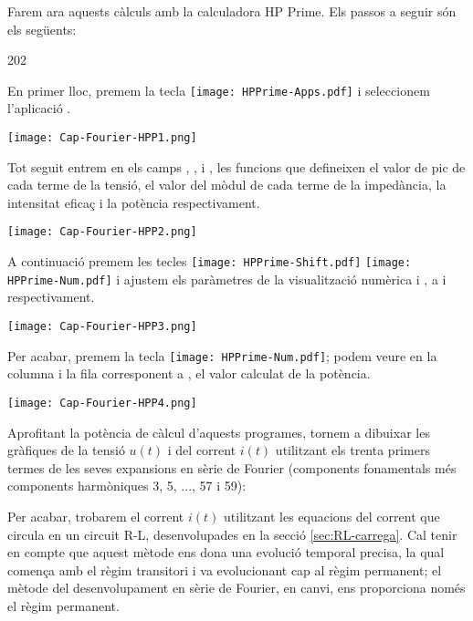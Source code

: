 \begin{exemple}
    Farem ara aquests càlculs amb la calculadora \textsf{HP Prime}.
     Els passos a seguir són els següents:

    \begin{dingautolist}{202}

        \item En primer lloc, premem la tecla \texttt{[image: HPPrime-Apps.pdf]} i seleccionem l'aplicació .

             \texttt{[image: Cap-Fourier-HPP1.png]}

        \item Tot seguit entrem en els camps , ,  i , les funcions que defineixen el valor de pic de cada terme de la tensió,  el valor del mòdul de cada terme de la impedància,  la intensitat eficaç i la potència respectivament.

            \texttt{[image: Cap-Fourier-HPP2.png]}

        \item  A continuació premem les tecles \texttt{[image: HPPrime-Shift.pdf]} \texttt{[image: HPPrime-Num.pdf]} i ajustem els paràmetres de la visualització numèrica  i , a  i  respectivament.

            \texttt{[image: Cap-Fourier-HPP3.png]}

        \item Per acabar, premem la tecla \texttt{[image: HPPrime-Num.pdf]}; podem veure en la columna  i la fila corresponent a , el valor calculat de la potència.

            \texttt{[image: Cap-Fourier-HPP4.png]}

    \end{dingautolist}

    Aprofitant la potència de càlcul d'aquests programes, tornem a dibuixar les gràfiques de la tensió $u(t)$ i del corrent $i(t)$ utilitzant els trenta primers termes de les seves expansions en sèrie de Fourier (components fonamentals més components harmòniques 3, 5, ..., 57 i 59):
    \vspace{-2mm}
    \begin{center}
      
    \end{center}

    Per acabar, trobarem el corrent $i(t)$ utilitzant les equacions del corrent que circula en un circuit R-L, desenvolupades en la secció \vref{sec:RL-carrega}. Cal tenir en compte que aquest mètode ens dona una evolució temporal precisa, la qual comença amb el règim transitori i va evolucionant cap al règim permanent; el mètode del desenvolupament en sèrie de Fourier, en canvi, ens proporciona només el règim permanent.


\end{exemple}
